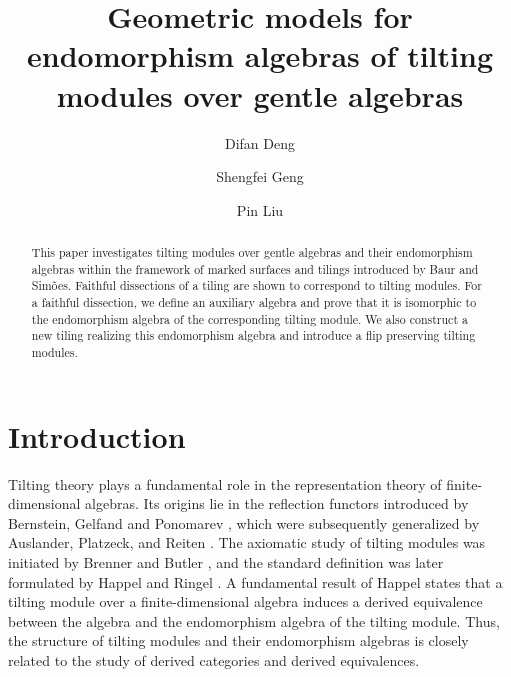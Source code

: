 \documentclass[a4paper,10pt]{amsart}
\title[Endomorphism algebras of tilting modules over gentle algebras]{Geometric models for endomorphism algebras of tilting modules over gentle algebras}
\author[Deng]{Difan Deng}
\author[Geng]{Shengfei Geng}
\author[Liu]{Pin Liu}
\theoremstyle{plain}          %
\theoremstyle{definition}
\begin{document}
\begin{abstract}
This paper investigates tilting modules over gentle algebras and their endomorphism algebras within the framework of marked surfaces and tilings introduced by Baur and Sim\~{o}es. Faithful dissections of a tiling are shown to correspond to tilting modules. For a faithful dissection, we define an auxiliary algebra and prove that it is isomorphic to the endomorphism algebra of the corresponding tilting module. We also construct a new tiling realizing this endomorphism algebra and introduce a  flip preserving tilting modules.
\end{abstract}


\maketitle	
\tableofcontents
\section{Introduction}\label{s:intro}

Tilting theory plays a fundamental role in the representation theory of finite-dimensional algebras. Its origins lie in the reflection functors introduced by Bernstein, Gelfand and Ponomarev \cite{BGP}, which were subsequently generalized by Auslander, Platzeck, and Reiten \cite{APR}. The axiomatic study of tilting modules was initiated by Brenner and Butler \cite{BB}, and the standard definition was later formulated by Happel and Ringel \cite{HR}. A fundamental result of Happel states that a tilting module over a finite-dimensional algebra induces a derived equivalence between the algebra and the endomorphism algebra of the tilting module. Thus, the structure of tilting modules and their endomorphism algebras is closely related to the study of derived categories and derived equivalences.


\end{document}
